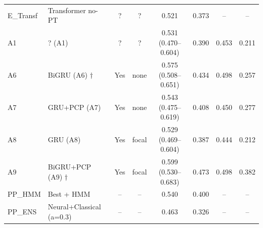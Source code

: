 \begin{table}[htbp]
\begin{tabular}{llcccccc}
E_Transf & Transformer no-PT & ? & ? & 0.521 & 0.373 & -- & -- \\
A1 & ? (A1) & ? & ? & 0.531 (0.470--0.604) & 0.390 & 0.453 & 0.211 \\
A6 & BiGRU (A6) $\dagger$ & Yes & none & 0.575 (0.508--0.651) & 0.434 & 0.498 & 0.257 \\
A7 & GRU+PCP (A7) & Yes & none & 0.543 (0.475--0.619) & 0.408 & 0.450 & 0.277 \\
A8 & GRU (A8) & Yes & focal & 0.529 (0.469--0.604) & 0.387 & 0.444 & 0.212 \\
A9 & BiGRU+PCP (A9) $\dagger$ & Yes & focal & 0.599 (0.530--0.683) & 0.473 & 0.498 & 0.382 \\
PP_HMM & Best + HMM & -- & -- & 0.540 & 0.400 & -- & -- \\
PP_ENS & Neural+Classical (a=0.3) & -- & -- & 0.463 & 0.326 & -- & -- \\
\bottomrule
\end{tabular}
\end{table}